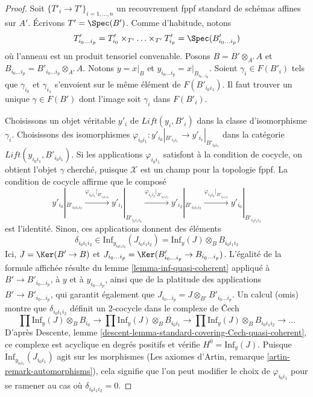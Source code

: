 \begin{proof}
Soit $\{T'_i \to T'\}_{i = 1, \ldots, n}$ un recouvrement fppf standard
de schémas affines sur $A'$. Écrivons $T' = \Spec(B')$. Comme d'habitude, notons
$$
T'_{i_0 \ldots i_p} =
T'_{i_0} \times_{T'} \ldots \times_{T'} T'_{i_p} = \Spec(B'_{i_0 \ldots i_p})
$$
où l'anneau est un produit tensoriel convenable.
Posons $B = B' \otimes_{A'} A$ et
$B_{i_0 \ldots i_p} = B'_{i_0 \ldots i_p} \otimes_{A'} A$.
Notons $y = x|_B$ et $y_{i_0 \ldots i_p} = x|_{B_{i_0 \ldots i_p}}$.
Soient $\gamma_i \in F(B'_i)$ tels que $\gamma_{i_0}$ et $\gamma_{i_1}$
s'envoient sur le même élément de $F(B'_{i_0i_1})$.
Il faut trouver un unique $\gamma \in F(B')$ dont l'image soit
$\gamma_i$ dans $F(B'_i)$.

\medskip\noindent
Choisissons un objet véritable $y'_i$ de $\textit{Lift}(y_i, B'_i)$
dans la classe d'isomorphisme $\gamma_i$.
Choisissons des isomorphismes
$\varphi_{i_0i_1} : y'_{i_0}|_{B'_{i_0i_1}} \to y'_{i_1}|_{B'_{i_0i_1}}$
dans la catégorie $\textit{Lift}(y_{i_0i_1}, B'_{i_0i_1})$.
Si les applications $\varphi_{i_0i_1}$ satisfont à la condition de cocycle,
on obtient l'objet $\gamma$ cherché, puisque $\mathcal{X}$ est
un champ pour la topologie fppf. La condition de cocycle affirme que le
composé
$$
y'_{i_0}|_{B'_{i_0i_1i_2}}
\xrightarrow{\varphi_{i_0i_1}|_{B'_{i_0i_1i_2}}}
y'_{i_1}|_{B'_{i_0i_1i_2}}
\xrightarrow{\varphi_{i_1i_2}|_{B'_{i_0i_1i_2}}}
y'_{i_2}|_{B'_{i_0i_1i_2}}
\xrightarrow{\varphi_{i_2i_0}|_{B'_{i_0i_1i_2}}}
y'_{i_0}|_{B'_{i_0i_1i_2}}
$$
est l'identité. Sinon, ces applications donnent des éléments
$$
\delta_{i_0i_1i_2} \in
\text{Inf}_{y_{i_0i_1i_2}}(J_{i_0i_1i_2}) =
\text{Inf}_y(J) \otimes_B B_{i_0i_1i_2}
$$
Ici, $J = \Ker(B' \to B)$ et
$J_{i_0 \ldots i_p} = \Ker(B'_{i_0 \ldots i_p} \to B_{i_0 \ldots i_p})$.
L'égalité de la formule affichée résulte du
lemme \ref{lemma-inf-quasi-coherent} appliqué à
$B' \to B'_{i_0 \ldots i_p}$, à $y$ et à $y_{i_0 \ldots i_p}$,
ainsi que de la platitude des applications $B' \to B'_{i_0 \ldots i_p}$,
qui garantit également que
$J_{i_0 \ldots i_p} = J \otimes_{B'} B'_{i_0 \ldots i_p}$.
Un calcul (omis) montre que $\delta_{i_0i_1i_2}$ définit
un $2$-cocycle dans le complexe de {\v C}ech
$$
\prod \text{Inf}_y(J) \otimes_B B_{i_0} \to
\prod \text{Inf}_y(J) \otimes_B B_{i_0i_1} \to
\prod \text{Inf}_y(J) \otimes_B B_{i_0i_1i_2} \to \ldots
$$
D'après Descente, lemme \ref{descent-lemma-standard-covering-Cech-quasi-coherent},
ce complexe est acyclique en degrés positifs et vérifie $H^0 = \text{Inf}_y(J)$.
Puisque $\text{Inf}_{y_{i_0i_1}}(J_{i_0i_1})$ agit sur les
morphismes (Les axiomes d'Artin, remarque \ref{artin-remark-automorphisms}),
cela signifie que l'on peut modifier le choix de $\varphi_{i_0i_1}$
pour se ramener au cas où $\delta_{i_0i_1i_2} = 0$.


\end{proof}
